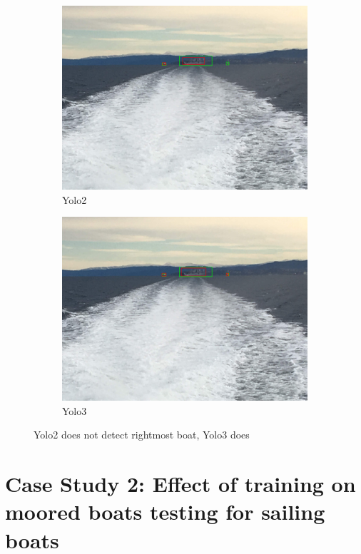 \begin{figure}[h!]
\begin{subfigure}{.5\textwidth}
  \centering
  \includegraphics[width=0.8\linewidth]{results/case_buildings/yolotrf/Yolo2/IMG_2350.jpg}
  \caption{Yolo2}
\end{subfigure}%
\begin{subfigure}{.5\textwidth}
  \centering
  \includegraphics[width=.8\linewidth]{results/case_buildings/yolotrf/Yolo3/IMG_2350.jpg}
  \caption{Yolo3}
\end{subfigure}
\caption{Yolo2 does not detect rightmost boat, Yolo3 does}
\label{fig:Yolo3_better_trf}
\end{figure}

\newpage
\clearpage

\section{Case Study 2: Effect of training on moored boats testing for sailing boats}
\label{sec:moored_boats}

